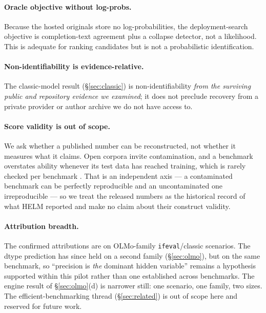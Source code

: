 \paragraph{Oracle objective without log-probs.} Because the hosted originals store
no log-probabilities, the deployment-search objective is completion-text agreement
plus a collapse detector, not a likelihood. This is adequate for ranking
candidates but is not a probabilistic identification.

\paragraph{Non-identifiability is evidence-relative.} The classic-model result
(\S\ref{sec:classic}) is non-identifiability \emph{from the surviving public and
repository evidence we examined}; it does not preclude recovery from a private
provider or author archive we do not have access to.

\paragraph{Score validity is out of scope.} We ask whether a published number can
be reconstructed, not whether it measures what it claims. Open corpora invite
contamination, and a benchmark overstates ability whenever its test data has
reached training, which is rarely checked per benchmark
\citep{sainz2023contamination}. That is an independent axis --- a contaminated
benchmark can be perfectly reproducible and an uncontaminated one irreproducible
--- so we treat the released numbers as the historical record of what HELM
reported and make no claim about their construct validity.

\paragraph{Attribution breadth.} The confirmed attributions are on OLMo-family
\texttt{ifeval}/classic scenarios. The dtype prediction has since held on a second
family (\S\ref{sec:olmo}), but on the same benchmark, so ``precision is
\emph{the} dominant hidden variable'' remains a hypothesis supported within this
pilot rather than one established across benchmarks. The engine result of
\S\ref{sec:olmo}(d) is narrower still: one scenario, one family, two sizes. The efficient-benchmarking thread
(\S\ref{sec:related}) is out of scope here and reserved for future work.
